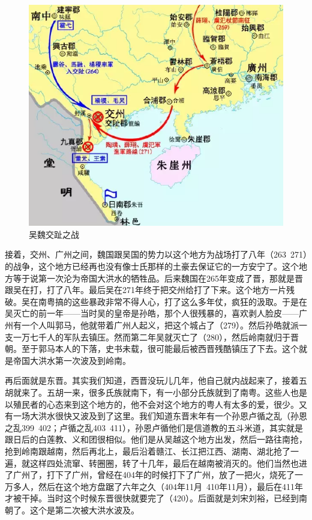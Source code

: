 \begin{figure}
	\centering
	\includegraphics[width=\textwidth]{images/image-18}
	\caption{吴魏交趾之战}
\end{figure}


接着，交州、广州之间，魏国跟吴国的势力以这个地方为战场打了八年（263~271）的战争，这个地方已经再也没有像士氏那样的土豪去保证它的一方安宁了。这个地方等于说第一次沦为帝国大洪水的牺牲品。后来魏国在265年变成了晋，那就是晋跟吴在打，打了八年。最后吴在271年终于把交州给打了下来。这个地方一片残破。吴在南粤搞的这些暴政非常不得人心，打了这么多年仗，疯狂的汲取。于是在吴灭亡的前一年——当时吴的皇帝是孙皓，那个人很残暴的，喜欢剥人脸皮——广州有一个人叫郭马，他就带着广州人起义，把这个城占了（279）。然后孙皓就派一支一万七千人的军队去镇压。然而第二年吴就灭亡了（280），然后岭南就归于晋朝。至于郭马本人的下落，史书未载，很可能最后被西晋残酷镇压了下去。这个就是帝国大洪水第一次波及到岭南。

再后面就是东晋。其实我们知道，西晋没玩儿几年，他自己就内战起来了，接着五胡就来了。五胡一来，很多氏族就南下，有一小部分氏族就到了南粤。这些人也是以殖民者的心态来到这个地方的，他不会对这个地方的粤人有太多的爱，很少。又有一场大洪水很快又波及到了这里。我们知道东晋末年有一个孙恩卢循之乱（孙恩之乱399~402；卢循之乱403~411），孙恩卢循他们是信道教的五斗米道，其实就是跟日后的白莲教、义和团很相似。他们是从吴越这个地方出发，然后一路往南抢，抢到岭南跟越南，然后再北上，最后沿着赣江、长江把江西、湖南、湖北抢了一遍，就这样四处流窜、转圈圈，转了十几年，最后在越南被消灭的。他们当然也进了广州了，打下了广州，曾经在404年的时候打下了广州，放了一把火，烧死了一万多人，然后在这个地方盘踞了六年之久（404年11月~410年11月），最后在411年才被干掉。当时这个时候东晋很快就要完了（420）。后面就是刘宋刘裕，已经到南朝了。这个是第二次被大洪水波及。

